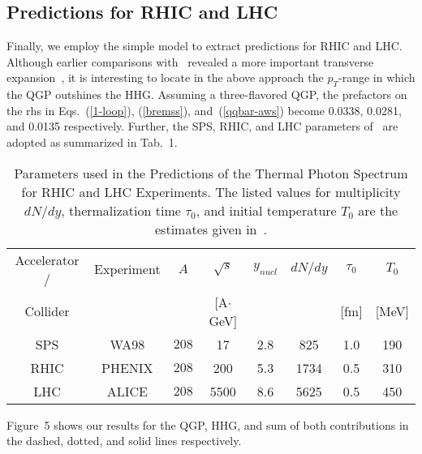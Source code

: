 \documentclass[12pt,twoside,fleqn]{article}
\newcommand{\tabcaptionwidth}{13.75cm}
\begin{document}
\subsection{Predictions for RHIC and LHC}
%
Finally, we employ the simple model to extract predictions for RHIC and LHC.
Although earlier comparisons with~\cite{SRIVASTAVA_1999} revealed a more
important transverse expansion~\cite{STEFFEN_1999}, it is interesting to locate
in the above approach the $p_T$-range in which the QGP outshines the HHG.
Assuming a three-flavored QGP, the prefactors on the rhs in Eqs.~(\ref{1-loop}),
(\ref{bremss}), and~(\ref{qqbar-aws}) become 0.0338, 0.0281, and 0.0135
respectively. Further, the SPS, RHIC, and LHC parameters
of~\cite{SRIVASTAVA_1999} are adopted as summarized in Tab.~1.
%
\begin{table}
\centering      
\begin{tabular}{|c|c|c|c|c|c|c|c|}
\hline
Accelerator / & Experiment & $A$   & $\sqrt{s}$    & $y_{nucl}$ & $dN/dy$ & $\tau_0$ & $T_0$ \\
Collider      &            &       & [A$\cdot$GeV] &            &         & [fm]     & [MeV] \\ 
\hline\hline
SPS           & WA98       & $208$ & 17            & 2.8        &  825    & 1.0      & 190   \\ 
\hline\hline
RHIC          & PHENIX     & $208$ & 200           & 5.3        & 1734    & 0.5      & 310   \\
LHC           & ALICE      & $208$ & 5500          & 8.6        & 5625    & 0.5      & 450   \\
\hline
\end{tabular}
\begin{center}
\parbox{\tabcaptionwidth}{
\caption[Parameters used in the Predictions of the Thermal Photon Spectrum for RHIC and LHC Experiments]{Parameters used in the Predictions of the Thermal Photon Spectrum for RHIC and LHC Experiments. The listed values for multiplicity $dN/dy$, thermalization time $\tau_0$, and initial temperature $T_0$ are the estimates given in~\cite{SRIVASTAVA_1999}.}}
\label{Tab_SPS_RHIC_LHC_parameters}
\end{center}
\end{table}
%
Figure~5 shows our results for the QGP, HHG, and sum of both contributions in
the dashed, dotted, and solid lines respectively.
\end{document}

